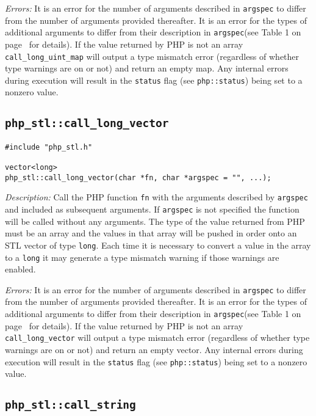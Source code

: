 \documentclass[11pt,titlepage]{article}
\begin{document}
\emph{Errors:} It is an error for the number of arguments described in \verb|argspec| to differ from the number of arguments provided thereafter. It is an error for the types of additional arguments to differ from their description in \verb|argspec|(see Table 1 on page~\pageref{Table1} for details). If the value returned by PHP is not an array \verb|call_long_uint_map| will output a type mismatch error (regardless of whether type warnings are on or not) and return an empty map. Any internal errors during execution will result in the \verb|status| flag (see \verb|php::status|) being set to a nonzero value.


\subsection{\texttt{php\_stl::call\_long\_vector}}

\begin{verbatim}
#include "php_stl.h"

vector<long> 
php_stl::call_long_vector(char *fn, char *argspec = "", ...);
\end{verbatim}

\emph{Description:} Call the PHP function \verb|fn| with the arguments described by \verb|argspec| and included as subsequent arguments. If \verb|argspec| is not specified the function will be called without any arguments. The type of the value returned from PHP must be an array and the values in that array will be pushed in order onto an STL vector of type \verb|long|. Each time it is necessary to convert a value in the array to a \verb|long| it may generate a type mismatch warning if those warnings are enabled.

\emph{Errors:} It is an error for the number of arguments described in \verb|argspec| to differ from the number of arguments provided thereafter. It is an error for the types of additional arguments to differ from their description in \verb|argspec|(see Table 1 on page~\pageref{Table1} for details). If the value returned by PHP is not an array \verb|call_long_vector| will output a type mismatch error (regardless of whether type warnings are on or not) and return an empty vector. Any internal errors during execution will result in the \verb|status| flag (see \verb|php::status|) being set to a nonzero value.


\subsection{\texttt{php\_stl::call\_string}}
\end{document}
